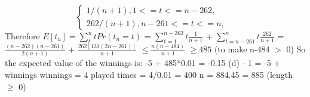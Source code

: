 \documentclass{assignment-263}
\begin{document}
\begin{enumerate}
\begin{equation}
\left\{
             \begin{array}{rcl}
             1/(n+1) ,      1<= t <= n-262, &\\
             262/(n+1), n-261 <= t <= n, &
             \end{array}
\right.
\end{equation}
Therefore $E[t_{u}] = \sum_{t}^{n} tPr(t_{n}=t)$\vskip5pt
\qquad \qquad \qquad = $\sum_{t=1}^{n-262} t \frac{1}{n+1}$ + $\sum_{t=n-261}^{n} t \frac{262}{n+1}$\vskip5pt 
\qquad \qquad \qquad = $\frac{(n-262)(n-261)}{2(n+1)}$ + $\frac{262[131(2n-261)]}{n+1}$\vskip5pt
\qquad \qquad \qquad $\le \frac{n(n-484)}{n+1}$ $\ge 485$ (to make n-484 $>$ 0)\vskip5pt
So the expected value of the winnings is: -5 + 485*0.01 = -0.15\vskip5pt
(d) - 1 = -5 + winnings \xrightarrow{} winnings = 4 \xrightarrow{} played times = 4/0.01 = 400 \xrightarrow{} n = 884.45 = 885 (length $\ge$ 0)




	\end{enumerate}


\program
\end{document}
